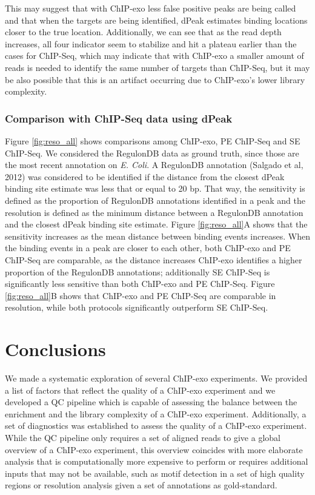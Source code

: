 \documentclass{bmcart}
\begin{document}
This may suggest that with ChIP-exo less false positive peaks are
being called and that when the targets are being identified, dPeak
estimates binding locations closer to the true location. Additionally,
we can see that as the read depth increases, all four indicator seem
to stabilize and hit a plateau earlier than the cases for ChIP-Seq,
which may indicate that with ChIP-exo a smaller amount of reads is
needed to identify the same number of targets than ChIP-Seq, but it
may be also possible that this is an artifact occurring due to
ChIP-exo's lower library complexity. 


\subsubsection*{Comparison with ChIP-Seq data using dPeak}

Figure \ref{fig:reso_all} shows comparisons among ChIP-exo, PE
ChIP-Seq and SE ChIP-Seq. We considered the RegulonDB data as ground
truth, since those are the most recent annotation on \emph{E. Coli}. A
RegulonDB annotation (Salgado et al, 2012\nocite{regulondb}) was
considered to be identified if the distance from the closest dPeak
binding site estimate was less that or equal to 20 bp. That way, the
sensitivity is defined as the proportion of RegulonDB annotations
identified in a peak and the resolution is defined as the minimum
distance between a RegulonDB annotation and the closest dPeak binding
site estimate. Figure \ref{fig:reso_all}A shows that the sensitivity
increases as the mean distance between binding events increases. When
the binding events in a peak are closer to each other, both ChIP-exo
and PE ChIP-Seq are comparable, as the distance increases ChIP-exo
identifies a higher proportion of the RegulonDB annotations;
additionally SE ChIP-Seq is significantly less sensitive than both
ChIP-exo and PE ChIP-Seq. Figure \ref{fig:reso_all}B shows that
ChIP-exo and PE ChIP-Seq are comparable in resolution, while both
protocols significantly outperform SE ChIP-Seq.

\section*{Conclusions}
\label{sec:conc}

We made a systematic exploration of several ChIP-exo experiments. We
provided a list of factors that reflect the quality of a ChIP-exo
experiment and we developed a QC pipeline which is capable of
assessing the balance between the enrichment and the library
complexity of a ChIP-exo experiment. Additionally, a set of
diagnostics was established to assess the quality of a ChIP-exo
experiment. While the QC pipeline only requires a set of aligned reads
to give a global overview of a ChIP-exo experiment, this overview
coincides with more elaborate analysis that is computationally more
expensive to perform or requires additional inputs that may not be
available, such as motif detection in a set of high quality regions or
resolution analysis given a set of annotations as gold-standard.
\end{document}
